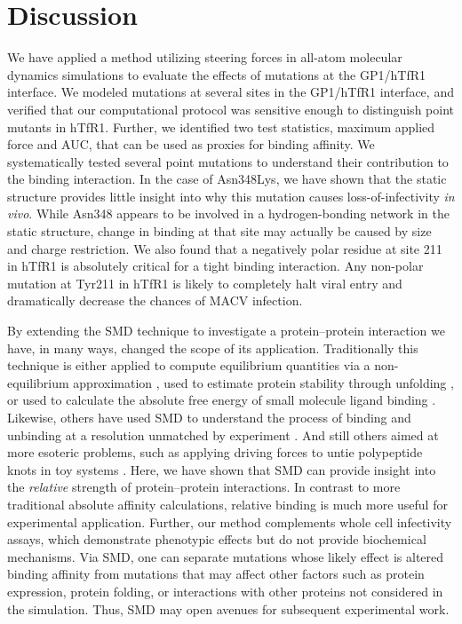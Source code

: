 \documentclass[12pt]{article}
\begin{document}
\section*{Discussion}

We have applied a method utilizing steering forces in all-atom molecular dynamics simulations to evaluate the effects of mutations at the GP1/hTfR1 interface. We modeled mutations at several sites in the GP1/hTfR1 interface, and verified that our computational protocol was sensitive enough to distinguish point mutants in hTfR1. Further, we identified two test statistics, maximum applied force and AUC, that can be used as proxies for binding affinity. We systematically tested several point mutations to understand their contribution to the binding interaction. In the case of Asn348Lys, we have shown that the static structure provides little insight into why this mutation causes loss-of-infectivity \textit{in vivo}. While Asn348 appears to be involved in a hydrogen-bonding network in the static structure, change in binding at that site may actually be caused by size and charge restriction. We also found that a negatively polar residue at site 211 in hTfR1 is absolutely critical for a tight binding interaction. Any non-polar mutation at Tyr211 in hTfR1 is likely to completely halt viral entry and dramatically decrease the chances of MACV infection.

By extending the SMD technique to investigate a protein--protein interaction we have, in many ways, changed the scope of its application. Traditionally this technique is either applied to compute equilibrium quantities via a non-equilibrium approximation \citep{Park2003,Park2004,Giorgino2011}, used to estimate protein stability through unfolding \citep{Lu1999}, or used to calculate the absolute free energy of small molecule ligand binding \citep{Dixit2001}. Likewise, others have used SMD to understand the process of binding and unbinding at a resolution unmatched by experiment \citep{Cuendet2011,Giorgino2011}. And still others aimed at more esoteric problems, such as applying driving forces to untie polypeptide knots in toy systems \citep{Sulkowska2010}. Here, we have shown that SMD can provide insight into the \textit{relative} strength of protein--protein interactions. In contrast to more traditional absolute affinity calculations, relative binding is much more useful for experimental application. Further, our method complements whole cell infectivity assays, which demonstrate phenotypic effects but do not provide biochemical mechanisms. Via SMD, one can separate mutations whose likely effect is altered binding affinity from mutations that may affect other factors such as protein expression, protein folding, or interactions with other proteins not considered in the simulation. Thus, SMD may open avenues for subsequent experimental work.
\end{document}
